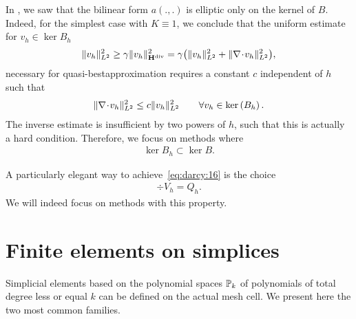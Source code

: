 \begin{intro}
  In , we saw that the
  bilinear form $a(.,.)$ is elliptic only on the kernel of
  $B$. Indeed, for the simplest case with $K\equiv 1$, we conclude
  that the uniform estimate for $v_h\in \ker{B_h}$
  \begin{gather}
    \norm{v_h}^2_{L^2}
    \ge \ellipa \norm{v_h}^2_{\Hdiv}
    = \ellipa \bigl(\norm{v_h}^2_{L^2} + \norm{\div v_h}^2_{L^2}\bigr),
  \end{gather}
  necessary for quasi-bestapproximation requires a constant $c$
  independent of $h$ such that
  \begin{gather}
    \norm{\div v_h}^2_{L^2} \le c \norm{v_h}^2_{L^2}
    \qquad\forall v_h\in\ker{B_h}.
  \end{gather}
  The inverse estimate is insufficient by two powers of $h$, such that
  this is actually a hard condition. Therefore, we focus on
  methods where
  \begin{gather}
    \label{eq:darcy:16}
    \ker{B_h} \subset \ker B.
  \end{gather}
\end{intro}

\begin{remark}
  A particularly elegant way to achieve~\eqref{eq:darcy:16} is the
  choice
  \begin{gather}
    \label{eq:darcy:17}
    \div V_h = Q_h.
  \end{gather}
  We will indeed focus on methods with this property.
\end{remark}

\section{Finite elements on simplices}

\begin{intro}
  Simplicial elements based on the polynomial spaces $\P_k$ of
  polynomials of total degree less or equal $k$ can be defined on the
  actual mesh cell. We present here the two most common families.
\end{intro}

